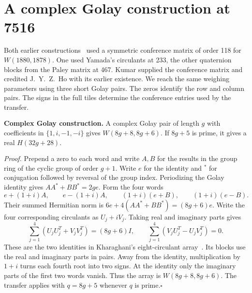 \documentclass[10pt]{article}
\begin{document}
\section*{A complex Golay construction at 7516}
Both earlier constructions~\cite{first7516} used a symmetric conference matrix of order 118 for $W(1880,1878)$. One used Yamada's circulants at 233, the other quaternion blocks from the Paley matrix at 467. Kumar supplied the conference matrix and credited J.~Y.~Z.~Ho with its earlier existence. We reach the same weighing parameters using three short Golay pairs. The zeros identify the row and column pairs. The signs in the full tiles determine the conference entries used by the transfer.

\medskip\noindent\textbf{Complex Golay construction.}
A complex Golay pair of length $g$ with coefficients in $\{1,i,-1,-i\}$ gives $W(8g+8,8g+6)$. If $8g+5$ is prime, it gives a real $H(32g+28)$.

\smallskip\noindent\emph{Proof.}
Prepend a zero to each word and write $A,B$ for the results in the group ring of the cyclic group of order $g+1$. Write $e$ for the identity and $^*$ for conjugation followed by reversal of the group index. Periodizing the Golay identity gives $AA^*+BB^*=2g e$. Form the four words
\[
e+(1+i)A,\qquad e-(1+i)A,\qquad (1+i)(e+B),\qquad (1+i)(e-B).
\]
Their summed Hermitian norm is $6e+4(AA^*+BB^*)=(8g+6)e$. Write the four corresponding circulants as $U_j+iV_j$. Taking real and imaginary parts gives
\[
 \sum_{j=1}^4 (U_jU_j^T+V_jV_j^T)=(8g+6)I,\qquad
 \sum_{j=1}^4(V_jU_j^T-U_jV_j^T)=0 .
\]
These are the two identities in Kharaghani's eight-circulant array~\cite{array}. Its blocks use the real and imaginary parts in pairs. Away from the identity, multiplication by $1+i$ turns each fourth root into two signs. At the identity only the imaginary parts of the first two words vanish. Thus the array is $W(8g+8,8g+6)$. The transfer applies with $q=8g+5$ whenever $q$ is prime.\hfill$\square$
\end{document}
